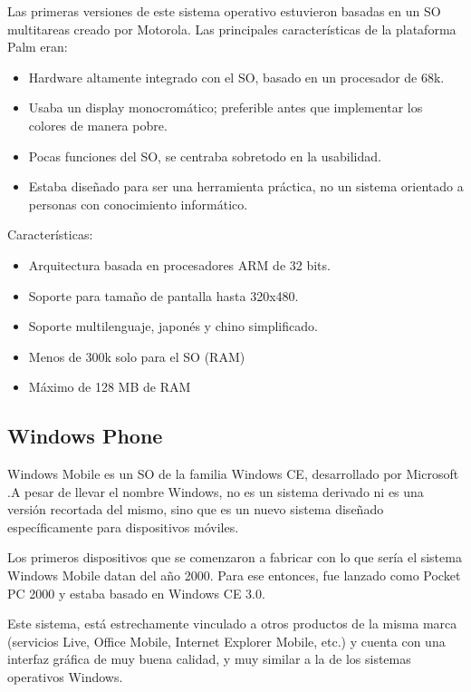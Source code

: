 Las primeras versiones de este sistema operativo estuvieron basadas en un SO multitareas creado por Motorola. Las principales características de la plataforma Palm eran:  
\begin{itemize}
	\item Hardware altamente integrado con el SO, basado en un procesador de 68k.
	\item Usaba un display monocromático; preferible antes que implementar los colores de manera pobre.
	\item Pocas funciones del SO, se centraba sobretodo en la usabilidad.
	\item Estaba diseñado para ser una herramienta práctica, no un sistema orientado a personas con conocimiento informático.	
\end{itemize}                                                                         

Características:

\begin{itemize}
	\item Arquitectura basada en procesadores ARM de 32 bits.
	\item Soporte para tamaño de pantalla hasta 320x480.
	\item Soporte multilenguaje, japonés y chino simplificado.
	\item Menos de 300k solo para el SO (RAM)
	\item Máximo de 128 MB de RAM
\end{itemize}

\subsection*{Windows Phone}
Windows Mobile es un SO de la familia Windows CE, desarrollado por Microsoft .A pesar de llevar el nombre Windows, no es un sistema derivado ni es una versión recortada del mismo, sino que es un nuevo sistema diseñado específicamente para dispositivos móviles.

Los primeros dispositivos que se comenzaron a fabricar con lo que sería el sistema Windows Mobile datan del año 2000. Para ese entonces, fue lanzado como Pocket PC 2000 y estaba basado en Windows CE 3.0.

Este sistema, está estrechamente vinculado a otros productos de la misma marca (servicios Live, Office Mobile, Internet Explorer Mobile, etc.) y cuenta con una interfaz gráfica de muy buena calidad, y muy similar a la de los sistemas operativos Windows.

